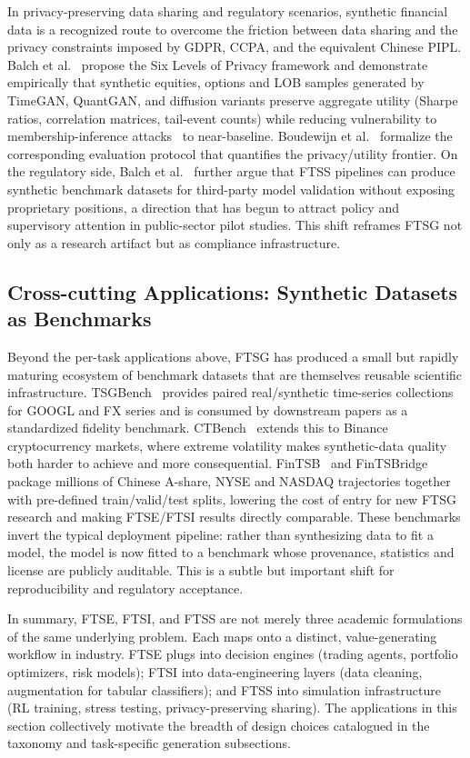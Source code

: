 In privacy-preserving data sharing and regulatory scenarios, synthetic financial data is a recognized route to overcome the friction
between data sharing and the privacy constraints imposed by GDPR, CCPA,
and the equivalent Chinese PIPL. Balch et al.~\citep{balch2024six} propose the Six Levels of
Privacy framework and demonstrate empirically that synthetic equities, options and LOB
samples generated by TimeGAN, QuantGAN, and diffusion variants preserve
aggregate utility (Sharpe ratios, correlation matrices, tail-event
counts) while reducing vulnerability to membership-inference attacks~\citep{shokri2017membership} to
near-baseline. Boudewijn et al.~\citep{boudewijn2023privacy} formalize the corresponding
evaluation protocol that quantifies the privacy/utility frontier. On
the regulatory side, Balch et al.~\citep{balch2024six} further argue that FTSS pipelines can
produce synthetic benchmark datasets for third-party model validation
without exposing proprietary positions, a direction that has begun to
attract policy and supervisory attention in public-sector pilot studies.
This shift reframes FTSG not only as a research artifact but as
compliance infrastructure.

\subsection{Cross-cutting Applications: Synthetic Datasets as Benchmarks}

Beyond the per-task applications above, FTSG has produced a small but
rapidly maturing ecosystem of benchmark datasets that are themselves
reusable scientific infrastructure. TSGBench~\citep{ang2023tsgbench}
provides paired real/synthetic time-series collections for GOOGL and FX
series and is consumed by downstream papers as a standardized fidelity
benchmark. CTBench~\citep{ang2025ctbench} extends this to Binance
cryptocurrency markets, where extreme volatility makes synthetic-data
quality both harder to achieve and more consequential.
FinTSB~\citep{hu2025fintsb} and FinTSBridge~\citep{wang2025fintsbridge}
package millions of Chinese A-share, NYSE and NASDAQ trajectories
together with pre-defined train/valid/test splits, lowering the cost of
entry for new FTSG research and making FTSE/FTSI results directly
comparable. These benchmarks invert the typical deployment pipeline:
rather than synthesizing data to fit a model, the model is now fitted
to a benchmark whose provenance, statistics and license are publicly
auditable. This is a subtle but important shift for reproducibility and
regulatory acceptance.

In summary, FTSE, FTSI, and FTSS are not merely three academic
formulations of the same underlying problem. Each maps onto a
distinct, value-generating workflow in industry. FTSE plugs into
decision engines (trading agents, portfolio optimizers, risk models);
FTSI into data-engineering layers (data cleaning, augmentation for
tabular classifiers); and FTSS into simulation infrastructure (RL
training, stress testing, privacy-preserving sharing). The applications
in this section collectively motivate the breadth of design choices
catalogued in the taxonomy and task-specific generation subsections.

